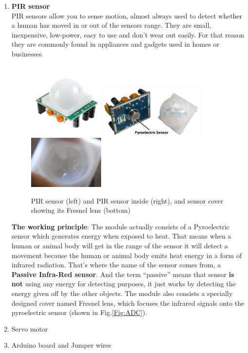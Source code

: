 \begin{enumerate}
		\item \textbf{PIR sensor}\\
		 PIR sensors allow you to sense motion, almost always used to detect whether a human has moved in or out of the sensors range. 
		 They are small, inexpensive, low-power, easy to use and don't wear out easily.
		 For that reason they are commonly found in appliances and gadgets used in homes or businesses. 
          \begin{figure}[H]
             \centering
             \includegraphics[width=0.36\textwidth]{figures/PIR}\qquad
             \includegraphics[width=0.5\textwidth]{figures/PIR2}\\
             \includegraphics[width=0.36\textwidth]{figures/PIR3}
             \caption[PIR sensor details]{PIR sensor (left) and PIR sensor inside (right), and sensor cover showing its Fresnel lens (bottom)}
             \label{Fig:PIR sensor}
         \end{figure}
		 \textbf{The working principle}: The module actually consists of a Pyroelectric sensor which generates energy when exposed to heat.
		 That means when a human or animal body will get in the range of the sensor it will detect a movement because the human or animal body emits heat energy in a form of infrared radiation. That’s where the name of the sensor comes from, a \textbf{Passive Infra-Red sensor}. And the term “passive” means that sensor \textbf{is not} using any energy for detecting purposes, it just works by detecting the energy given off by the other objects. The module also consists a specially designed cover named Fresnel lens, which focuses the infrared signals onto the pyroelectric sensor (shown in Fig.\ref{Fig:ADC}).
		\item Servo motor 
		\item Arduino board and Jumper wires
	\end{enumerate}

